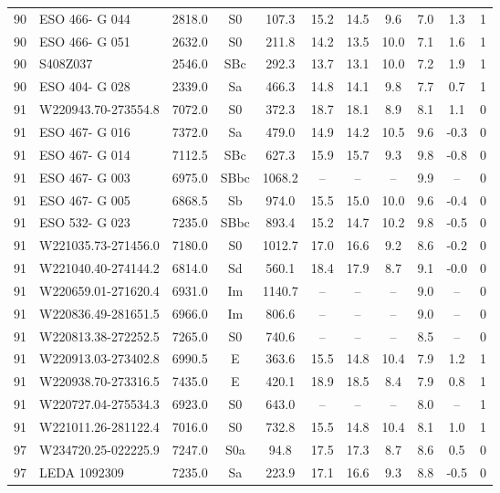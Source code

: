 {\begin{longtable}{clccccccccc}
 90 & ESO 466- G 044 & 2818.0 & S0 & 107.3 & 15.2 & 14.5 & 9.6 & 7.0 & 1.3 & 1 \\ 
 90 & ESO 466- G 051 & 2632.0 & S0 & 211.8 & 14.2 & 13.5 & 10.0 & 7.1 & 1.6 & 1 \\ 
 90 & S408Z037 & 2546.0 & SBc & 292.3 & 13.7 & 13.1 & 10.0 & 7.2 & 1.9 & 1 \\ 
 90 & ESO 404- G 028 & 2339.0 & Sa & 466.3 & 14.8 & 14.1 & 9.8 & 7.7 & 0.7 & 1 \\ 
 91 & W220943.70-273554.8 & 7072.0 & S0 & 372.3 & 18.7 & 18.1 & 8.9 & 8.1 & 1.1 & 0 \\ 
 91 & ESO 467- G 016 & 7372.0 & Sa & 479.0 & 14.9 & 14.2 & 10.5 & 9.6 & -0.3 & 0 \\ 
 91 & ESO 467- G 014 & 7112.5 & SBc & 627.3 & 15.9 & 15.7 & 9.3 & 9.8 & -0.8 & 0 \\ 
 91 & ESO 467- G 003 & 6975.0 & SBbc & 1068.2 & -- & -- & -- & 9.9 & -- & 0 \\ 
 91 & ESO 467- G 005 & 6868.5 & Sb & 974.0 & 15.5 & 15.0 & 10.0 & 9.6 & -0.4 & 0 \\ 
 91 & ESO 532- G 023 & 7235.0 & SBbc & 893.4 & 15.2 & 14.7 & 10.2 & 9.8 & -0.5 & 0 \\ 
 91 & W221035.73-271456.0 & 7180.0 & S0 & 1012.7 & 17.0 & 16.6 & 9.2 & 8.6 & -0.2 & 0 \\ 
 91 & W221040.40-274144.2 & 6814.0 & Sd & 560.1 & 18.4 & 17.9 & 8.7 & 9.1 & -0.0 & 0 \\ 
 91 & W220659.01-271620.4 & 6931.0 & Im & 1140.7 & -- & -- & -- & 9.0 & -- & 0 \\ 
 91 & W220836.49-281651.5 & 6966.0 & Im & 806.6 & -- & -- & -- & 9.0 & -- & 0 \\ 
 91 & W220813.38-272252.5 & 7265.0 & S0 & 740.6 & -- & -- & -- & 8.5 & -- & 0 \\ 
 91 & W220913.03-273402.8 & 6990.5 & E & 363.6 & 15.5 & 14.8 & 10.4 & 7.9 & 1.2 & 1 \\ 
 91 & W220938.70-273316.5 & 7435.0 & E & 420.1 & 18.9 & 18.5 & 8.4 & 7.9 & 0.8 & 1 \\ 
 91 & W220727.04-275534.3 & 6923.0 & S0 & 643.0 & -- & -- & -- & 8.0 & -- & 1 \\ 
 91 & W221011.26-281122.4 & 7016.0 & S0 & 732.8 & 15.5 & 14.8 & 10.4 & 8.1 & 1.0 & 1 \\ 
 97 & W234720.25-022225.9 & 7247.0 & S0a & 94.8 & 17.5 & 17.3 & 8.7 & 8.6 & 0.5 & 0 \\ 
 97 & LEDA 1092309 & 7235.0 & Sa & 223.9 & 17.1 & 16.6 & 9.3 & 8.8 & -0.5 & 0 \\ 

\end{longtable}}
